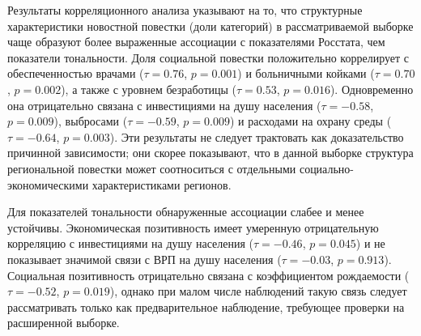 \documentclass[master, och, coursework]{SCWorks1}
\begin{document}
Результаты корреляционного анализа указывают на то, что структурные характеристики новостной повестки (доли категорий) в рассматриваемой выборке чаще образуют более выраженные ассоциации с показателями Росстата, чем показатели тональности. Доля социальной повестки положительно коррелирует с обеспеченностью врачами ($\tau = 0.76$, $p = 0.001$) и больничными койками ($\tau = 0.70$, $p = 0.002$), а также с уровнем безработицы ($\tau = 0.53$, $p = 0.016$). Одновременно она отрицательно связана с инвестициями на душу населения ($\tau = -0.58$, $p = 0.009$), выбросами ($\tau = -0.59$, $p = 0.009$) и расходами на охрану среды ($\tau = -0.64$, $p = 0.003$). Эти результаты не следует трактовать как доказательство причинной зависимости; они скорее показывают, что в данной выборке структура региональной повестки может соотноситься с отдельными социально-экономическими характеристиками регионов.

Для показателей тональности обнаруженные ассоциации слабее и менее устойчивы. Экономическая позитивность имеет умеренную отрицательную корреляцию с инвестициями на душу населения ($\tau = -0.46$, $p = 0.045$) и не показывает значимой связи с ВРП на душу населения ($\tau = -0.03$, $p = 0.913$). Социальная позитивность отрицательно связана с коэффициентом рождаемости ($\tau = -0.52$, $p = 0.019$), однако при малом числе наблюдений такую связь следует рассматривать только как предварительное наблюдение, требующее проверки на расширенной выборке.
\end{document}
